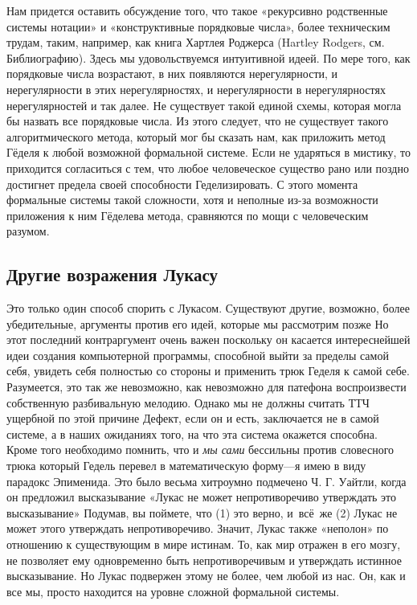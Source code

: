 \documentclass[../main.tex]{subfiles}
\begin{document}
Нам придется оставить обсуждение того, что такое «рекурсивно родственные системы нотации» и «конструктивные порядковые числа», более техническим трудам, таким, например, как книга Хартлея Роджерса (Hartley Rodgers, см. Библиографию). Здесь мы удовольствуемся интуитивной идеей. По мере того, как порядковые числа возрастают, в них появляются нерегулярности, и нерегулярности в этих нерегулярностях, и нерегулярности в нерегулярностях нерегулярностей и так далее. Не существует такой единой схемы, которая могла бы назвать все порядковые числа. Из этого следует, что не существует такого алгоритмического метода, который мог бы сказать нам, как приложить метод Гёделя к любой возможной формальной системе. Если не ударяться в мистику, то приходится согласиться с тем, что любое человеческое существо рано или поздно достигнет предела своей способности Геделизировать. С этого момента формальные системы такой сложности, хотя и неполные из-за возможности приложения к ним Гёделева метода, сравняются по мощи с человеческим разумом.


\subsection{Другие возражения Лукасу}

Это только один способ спорить с Лукасом. Существуют другие, возможно, более убедительные, аргументы против его идей, которые мы рассмотрим позже Но этот последний контраргумент очень важен поскольку он касается интереснейшей идеи создания компьютерной программы, способной выйти за пределы самой себя, увидеть себя полностью со стороны и применить трюк Геделя к самой себе. Разумеется, это так же невозможно, как невозможно для патефона воспроизвести собственную разбивальную мелодию. Однако мы не должны считать ТТЧ ущербной по этой причине Дефект, если он и есть, заключается не в самой системе, а в наших ожиданиях того, на что эта система окажется способна. Кроме того необходимо помнить, что и \emph{мы сами} бессильны против словесного трюка который Гедель перевел в математическую форму---я имею в виду парадокс Эпименида. Это было весьма хитроумно подмечено Ч. Г. Уайтли, когда он предложил высказывание «Лукас не может непротиворечиво утверждать это высказывание» Подумав, вы поймете, что (1) это верно, и~всё~же (2) Лукас не может этого утверждать непротиворечиво. Значит, Лукас также «неполон» по отношению к существующим в мире истинам. То, как мир отражен в его мозгу, не позволяет ему одновременно быть непротиворечивым и утверждать истинное высказывание. Но Лукас подвержен этому не более, чем любой из нас. Он, как и все мы, просто находится на уровне сложной формальной системы.
\end{document}
